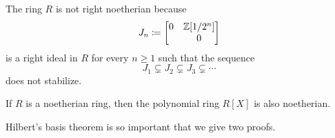 \begin{example}
\begin{enumerate}
      The ring $R$ is not right noetherian because
      \[
                  J_n
        \coloneqq  \begin{bmatrix}
                    0 & \mathbb{Z}[1/2^n] \\
                      & 0
                  \end{bmatrix}
      \]
      is a right ideal in $R$ for every $n \geq 1$ such that the sequence
      \[
                    J_1
        \subsetneq  J_2
        \subsetneq  J_3
        \subsetneq  \dotsb
      \]
      does not stabilize.
  \end{enumerate}
\end{example}



\begin{theorem}
  \label{theorem: Hilberts basis theorem}
  If $R$ is a noetherian ring, then the polynomial ring $R[X]$ is also noetherian.
\end{theorem}


\begin{fluff}
  Hilbert’s basis theorem is so important that we give two proofs.
\end{fluff}


